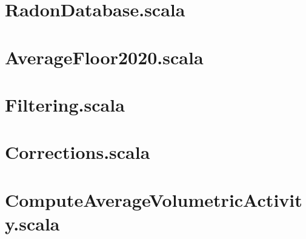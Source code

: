 \UseRawInputEncoding

\section{RadonDatabase.scala}\label{sectionRadonDatabaseScala}


\section{AverageFloor2020.scala}\label{sectionAverageFloor2020Scala}


\section{Filtering.scala}\label{sectionFilteringScala}


\section{Corrections.scala}\label{sectionCorrectionsScala}


\section{ComputeAverageVolumetricActivity.scala}\label{sectionComputeAverageVolumetricActivityScala}
